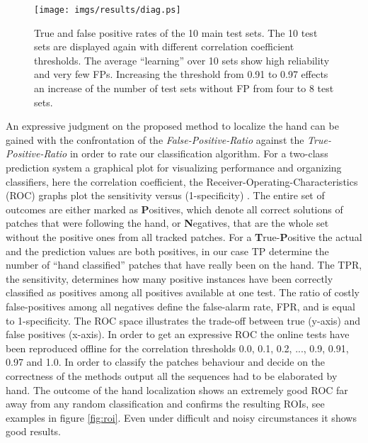 \documentclass[conference]{IEEEtran}
\begin{document}
%
\begin{figure}
	\begin{center}
		\texttt{[image: imgs/results/diag.ps]}
			\caption[True and false positive rates of the 10 main test sets. ]{True and false positive rates of the 10 main test sets. The 10 test sets are displayed again with different correlation coefficient thresholds. The average ``learning'' over 10 sets show high reliability and very few FPs. Increasing the threshold from 0.91 to 0.97 effects an increase of the number of test sets without FP from four to 8 test sets.}
			\label{fig:result:diag}
	\end{center}
\end{figure}
%
%
An expressive judgment on the proposed method to localize the hand can be gained with the confrontation of the \textit{False-Positive-Ratio} against the \textit{True-Positive-Ratio} in order to rate our classification algorithm. For a two-class prediction system a graphical plot for visualizing performance and organizing classifiers, here the correlation coefficient, the Receiver-Operating-Characteristics (ROC) graphs plot the sensitivity versus (1-specificity) \cite{ROC04-03}. The entire set of outcomes are either marked as \textbf{P}ositives, which denote all correct solutions of patches that were following the hand, or \textbf{N}egatives, that are the whole set without the positive ones from all tracked patches. %
For a \textbf{T}rue-\textbf{P}ositive the actual and the prediction values are both positives, in our case TP determine the number of ``hand classified'' patches that have really been on the hand. %
The TPR, the sensitivity, determines how many positive instances have been correctly classified as positives among all positives available at one test. The ratio of costly false-positives among all negatives define the false-alarm rate, FPR, and is equal to 1-specificity. %
The ROC space illustrates the trade-off between true (y-axis) and false positives (x-axis). In order to get an expressive ROC the online tests have been reproduced offline for the correlation thresholds 0.0, 0.1, 0.2, ..., 0.9, 0.91, 0.97 and 1.0. In order to classify the patches behaviour and decide on the correctness of the methods output all the sequences had to be elaborated by hand. The outcome of the hand localization shows an extremely good ROC far away from any random classification and confirms the resulting ROIs, see examples in figure \ref{fig:roi}. Even under difficult and noisy circumstances it shows good results.
\end{document}
